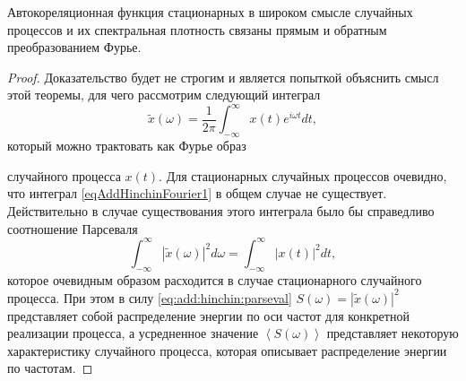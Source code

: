 \begin{theorem}
\label{thm:khinchin_wiener}
Автокореляционная функция стационарных в широком смысле случайных процессов
и их спектральная плотность связаны прямым и обратным
преобразованием Фурье.

\begin{proof}
Доказательство будет не строгим и является попыткой объяснить смысл
этой теоремы, для чего рассмотрим следующий интеграл
\begin{equation}
\tilde{x}\left(\omega\right) = \frac{1}{2 \pi}
\int_{-\infty}^{\infty}x\left(t\right)e^{i \omega t}dt,
\label{eqAddHinchinFourier1}
\end{equation}
который можно трактовать как Фурье образ 

случайного процесса
$x\left(t\right)$. Для стационарных случайных процессов очевидно, что
интеграл \eqref{eqAddHinchinFourier1} в общем случае не существует.
Действительно в случае существования этого интеграла было бы
справедливо соотношение Парсеваля
\begin{equation}
\int_{-\infty}^\infty \left|\tilde{x}\left(\omega\right)\right|^2 d
\omega = \int_{-\infty}^\infty \left|x\left(t\right)\right|^2 dt,
\label{eq:add:hinchin:parseval}
\end{equation}
которое очевидным образом расходится в случае стационарного случайного
процесса. При этом в силу \eqref{eq:add:hinchin:parseval} 
$S\left(\omega\right) =\left|\tilde{x}\left(\omega\right)\right|^2$ представляет собой
распределение энергии по оси частот для конкретной реализации
процесса, а усредненное значение 
$\left<S\left(\omega\right)\right>$ представляет некоторую
характеристику случайного процесса, которая описывает распределение
энергии по частотам.


\end{proof}
\end{theorem}
